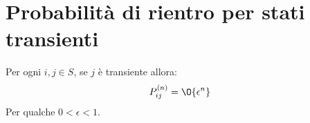\documentclass[\main/main.tex]{subfiles}
\begin{document}
\section{Probabilità di rientro per stati transienti}
\begin{theorem}
  Per ogni \(i,j \in S\), se \(j\) è transiente allora:
  \[
    P^{(n)}_{ij} = \O{\epsilon^n}
  \]
  Per qualche \(0<\epsilon<1\).
\end{theorem}
\end{document}
